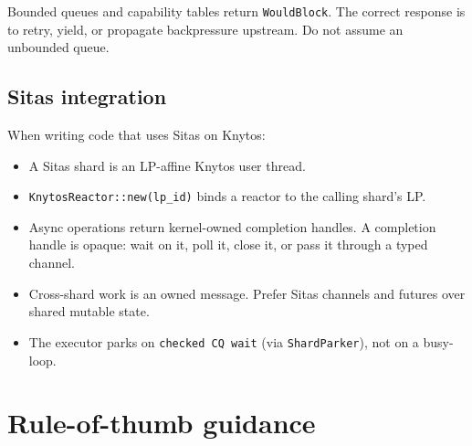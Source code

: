 Bounded queues and capability tables return \texttt{WouldBlock}. The correct
response is to retry, yield, or propagate backpressure upstream. Do not assume 
an unbounded queue.

\subsection{Sitas integration}

When writing code that uses Sitas on Knytos:

\begin{itemize}
    \item A Sitas shard is an LP-affine Knytos user thread.
    \item \texttt{KnytosReactor::new(lp\_id)} binds a reactor to the calling
        shard's LP.
    \item Async operations return kernel-owned completion handles. A completion
        handle is opaque: wait on it, poll it, close it, or pass it through a
        typed channel.
    \item Cross-shard work is an owned message. Prefer Sitas channels and
        futures over shared mutable state.
    \item The executor parks on \texttt{checked CQ wait} (via \texttt{ShardParker}),
        not on a busy-loop.
\end{itemize}

\section{Rule-of-thumb guidance}

